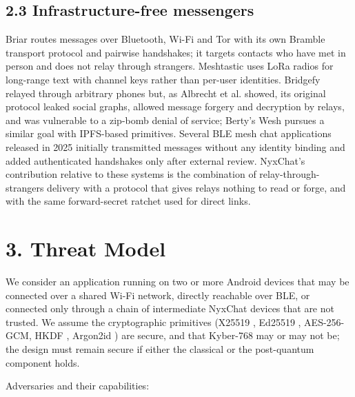 \documentclass[conference]{IEEEtran}
\begin{document}
\subsection{2.3 Infrastructure-free messengers}
Briar \cite{ref11} routes messages over Bluetooth, Wi-Fi and Tor with its own Bramble transport protocol and pairwise handshakes; it targets contacts who have met in person and does not relay through strangers. Meshtastic \cite{ref12} uses LoRa radios for long-range text with channel keys rather than per-user identities. Bridgefy \cite{ref6} relayed through arbitrary phones but, as Albrecht et al. showed, its original protocol leaked social graphs, allowed message forgery and decryption by relays, and was vulnerable to a zip-bomb denial of service; Berty's Wesh \cite{ref20} pursues a similar goal with IPFS-based primitives. Several BLE mesh chat applications released in 2025 initially transmitted messages without any identity binding and added authenticated handshakes only after external review. NyxChat's contribution relative to these systems is the combination of relay-through-strangers delivery with a protocol that gives relays nothing to read or forge, and with the same forward-secret ratchet used for direct links.

\section{3. Threat Model}
We consider an application running on two or more Android devices that may be connected over a shared Wi-Fi network, directly reachable over BLE, or connected only through a chain of intermediate NyxChat devices that are not trusted. We assume the cryptographic primitives (X25519 \cite{ref17}, Ed25519 \cite{ref22}, AES-256-GCM, HKDF \cite{ref16}, Argon2id \cite{ref15}) are secure, and that Kyber-768 \cite{ref21} may or may not be; the design must remain secure if either the classical or the post-quantum component holds.

Adversaries and their capabilities:
\end{document}
